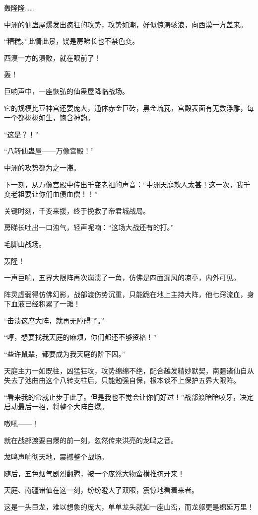 \begin{this_body}
轰隆隆……

中洲的仙蛊屋爆发出疯狂的攻势，攻势如潮，好似惊涛骇浪，向西漠一方盖来。

“糟糕。”此情此景，饶是房睇长也不禁色变。

西漠一方的溃败，就在眼前了！

轰！

巨响声中，一座恢弘的仙蛊屋降临战场。

它的规模比豆神宫还要庞大，通体赤金巨砖，黑金琉瓦，宫殿表面有无数浮雕，每一个都栩栩如生，饱含神韵。

“这是？！”

“八转仙蛊屋——万像宫殿！”

中洲的攻势都为之一滞。

下一刻，从万像宫殿中传出千变老祖的声音：“中洲天庭欺人太甚！这一次，我千变老祖要让你们血债血偿！！”

关键时刻，千变来援，终于挽救了帝君城战局。

房睇长吐出一口浊气，轻声呢喃：“这场大战还有的打。”

毛脚山战场。

轰隆！

一声巨响，五界大限阵再次崩溃了一角，仿佛是四面漏风的凉亭，内外可见。

阵灵虚弱得仿佛幻影，战部渡伤势沉重，只能跪在地上主持大阵，他七窍流血，身下血液已经积累了一滩！

“击溃这座大阵，就再无障碍了。”

“哼，想要找我天庭的麻烦，你们都还不够资格！”

“些许鼠辈，都要成为我天庭的阶下囚。”

天庭主力一如既往，凶猛狂攻，攻势绵绵不绝，配合越发精妙默契，南疆诸仙自从失去了池曲由这个八转支柱后，只能勉强自保，根本谈不上保护五界大限阵。

“看来我的命就止步于此了。但是我也不觉会让你们好过！”战部渡暗暗咬牙，决定启动最后一招，将整个大阵自爆。

嗷吼——！

就在战部渡要自爆的前一刻，忽然传来洪亮的龙鸣之音。

龙鸣声响彻天地，震撼整个战场。

随后，五色烟气剧烈翻腾，被一个庞然大物蛮横推挤开来！

天庭、南疆诸仙在这一刻，纷纷瞪大了双眼，震惊地看着来者。

这是一头巨龙，难以想象的庞大，单单龙头就如一座山峦，而龙躯更是绵延万里！


\end{this_body}
